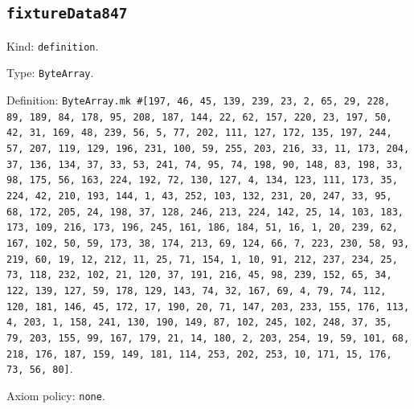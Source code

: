 \documentclass[11pt]{article}
\begin{document}
\subsection*{\texttt{fixtureData847}}
\noindent Kind: \texttt{definition}.\par
\noindent Type: \texttt{ByteArray}.\par
\noindent Definition: \texttt{ByteArray.mk \#[197, 46, 45, 139, 239, 23, 2, 65, 29, 228, 89, 189, 84, 178, 95, 208, 187, 144, 22, 62, 157, 220, 23, 197, 50, 42, 31, 169, 48, 239, 56, 5, 77, 202, 111, 127, 172, 135, 197, 244, 57, 207, 119, 129, 196, 231, 100, 59, 255, 203, 216, 33, 11, 173, 204, 37, 136, 134, 37, 33, 53, 241, 74, 95, 74, 198, 90, 148, 83, 198, 33, 98, 175, 56, 163, 224, 192, 72, 130, 127, 4, 134, 123, 111, 173, 35, 224, 42, 210, 193, 144, 1, 43, 252, 103, 132, 231, 20, 247, 33, 95, 68, 172, 205, 24, 198, 37, 128, 246, 213, 224, 142, 25, 14, 103, 183, 173, 109, 216, 173, 196, 245, 161, 186, 184, 51, 16, 1, 20, 239, 62, 167, 102, 50, 59, 173, 38, 174, 213, 69, 124, 66, 7, 223, 230, 58, 93, 219, 60, 19, 12, 212, 11, 25, 71, 154, 1, 10, 91, 212, 237, 234, 25, 73, 118, 232, 102, 21, 120, 37, 191, 216, 45, 98, 239, 152, 65, 34, 122, 139, 127, 59, 178, 129, 143, 74, 32, 167, 69, 4, 79, 74, 112, 120, 181, 146, 45, 172, 17, 190, 20, 71, 147, 203, 233, 155, 176, 113, 4, 203, 1, 158, 241, 130, 190, 149, 87, 102, 245, 102, 248, 37, 35, 79, 203, 155, 99, 167, 179, 21, 14, 180, 2, 203, 254, 19, 59, 101, 68, 218, 176, 187, 159, 149, 181, 114, 253, 202, 253, 10, 171, 15, 176, 73, 56, 80]}.\par
\noindent Axiom policy: \texttt{none}.\par
\end{document}
